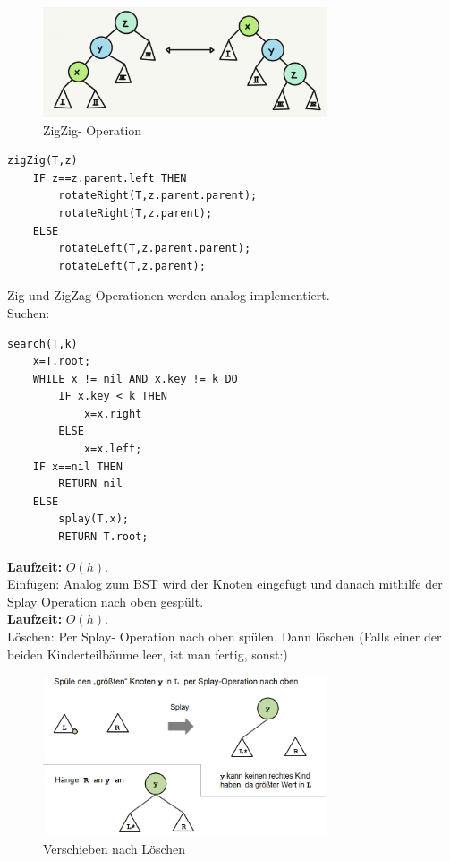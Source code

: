\documentclass{article}
\begin{document}
            \begin{figure}[ht]
                \centering
                \includegraphics[width=0.75\textwidth]{Bilder/SplayZigZig.png}
                \caption{ZigZig- Operation}
                \label{fig:SplayBaeumeZigZig}
            \end{figure}
            \begin{lstlisting}[style=pseudocode]
zigZig(T,z)
    IF z==z.parent.left THEN
        rotateRight(T,z.parent.parent);
        rotateRight(T,z.parent);
    ELSE
        rotateLeft(T,z.parent.parent);
        rotateLeft(T,z.parent);
            \end{lstlisting}
            Zig und ZigZag Operationen werden analog implementiert. \\
            Suchen:
            \begin{lstlisting}[style=pseudocode]
search(T,k)
    x=T.root;
    WHILE x != nil AND x.key != k DO
        IF x.key < k THEN
            x=x.right
        ELSE
            x=x.left;
    IF x==nil THEN
        RETURN nil
    ELSE
        splay(T,x);
        RETURN T.root;
            \end{lstlisting}
            \textbf{Laufzeit:} $O(h)$.\\
            Einfügen: Analog zum BST wird der Knoten eingefügt und danach mithilfe der Splay Operation nach oben gespült.\\
            \textbf{Laufzeit:} $O(h)$.\\
            Löschen: Per Splay- Operation nach oben spülen. Dann löschen (Falls einer der beiden Kinderteilbäume leer, ist man fertig, sonst:)\\
            \begin{figure}[ht]
                \centering
                \includegraphics[width=0.75\textwidth]{Bilder/SplaynachL.png}
                \caption{Verschieben nach Löschen}
                \label{fig:SplaynachL}
            \end{figure}
            \newpage
\end{document}
